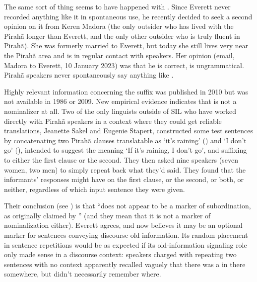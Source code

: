 \documentclass[output=paper,colorlinks,citecolor=brown
]{langscibook}
\begin{document}
The same sort of thing seems to have happened with . Since Everett
never recorded anything like it in spontaneous use, he recently decided
to seek a second opinion on it from Keren Madora (the only outsider who
has lived with the Pirahã longer than Everett, and the only other
outsider who is truly fluent in Pirahã). She was formerly married
to Everett, but today she still lives very near the Pirahã area
and is in regular contact with speakers. Her opinion (email, Madora
to Everett, 10 January 2023) was that he is correct,  is
ungrammatical. Pirahã speakers never spontaneously say anything
like .

Highly relevant information concerning the suffix \mbox{}
was published in 2010 but was not available in 1986 or 2009. New empirical
evidence indicates that \mbox{} is not a nominalizer at all.
Two of the only linguists outside of SIL who have worked directly
with Pirahã speakers in a context where they could get reliable
translations, Jeanette Sakel and Eugenie Stapert, constructed some
test sentences by concatenating two Pirahã clauses translatable
as `it's raining' () and `I don't go' (), intended to suggest the meaning `If it's raining,
I don't go', and suffixing \mbox{} to either the first
clause or the second. They then asked nine speakers (seven women, two
men) to simply repeat back what they'd said. They found that the
informants' responses might have \mbox{} on the first
clause, or the second, or both, or neither, regardless of which input
sentence they were given.

Their conclusion (see \citealt[5--6]{SakeStap10}) is that
\mbox{} ``does not appear to be a marker of subordination,
as originally claimed by \citet{everett1986piraha}'' (and they mean that it is
not a marker of nominalization either). Everett agrees, and now
believes it may be an optional marker for sentences conveying
discourse-old information. Its random placement in sentence repetitions
would be as expected if its old-information signaling role only made
sense in a discourse context: speakers charged with repeating two
sentences with no context apparently recalled vaguely that there was
a \mbox{} in there somewhere, but didn't necessarily
remember where.
\end{document}

